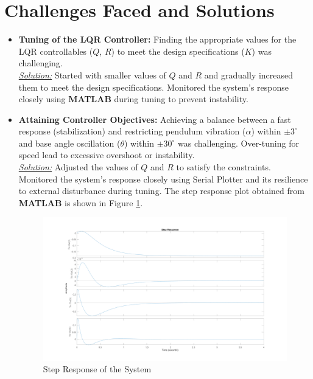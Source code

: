 \documentclass{article}
\begin{document}
\section{Challenges Faced and Solutions}
\begin{itemize}%
    \item \textbf{Tuning of the LQR Controller:} Finding the appropriate values for the LQR controllables ($Q$, $R$) to meet the design specifications ($K$) was challenging.\\
    \underline{\textit{Solution:}} Started with smaller values of $Q$ and $R$ and gradually increased them to meet the design specifications. Monitored the system's response closely using \textbf{MATLAB} during tuning to prevent instability.

    \item \textbf{Attaining Controller Objectives:} Achieving a balance between a fast response (stabilization) and restricting pendulum vibration ($\alpha$) within $\pm 3^{\circ}$ and base angle oscillation ($\theta$) within $\pm 30^{\circ}$ was challenging. Over-tuning for speed lead to excessive overshoot or instability.\\
    \underline{\textit{Solution:}} Adjusted the values of $Q$ and $R$ to satisfy the constraints. Monitored the system's response closely using Serial Plotter and its resilience to external disturbance during tuning. The step response plot obtained from \textbf{MATLAB} is shown in Figure \ref{fig:step}.
    \begin{figure}[!htb]
        \centering
        \includegraphics[width=\textwidth]{../././step_response.png}
        \caption{Step Response of the System}
        \label{fig:step}
    \end{figure}
    \vspace{-10pt}
\end{itemize}
\end{document}
